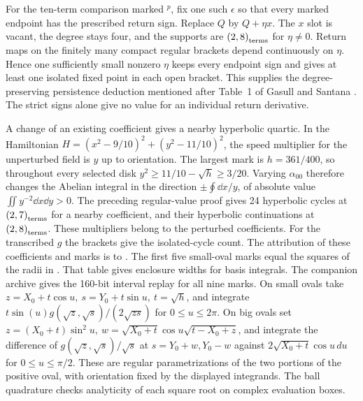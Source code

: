 For the ten-term comparison marked \(^{p}\), fix one such \(\epsilon\) so that every marked endpoint has the prescribed return sign. Replace \(Q\) by \(Q+\eta x\). The \(x\) slot is vacant, the degree stays four, and the supports are \(\left(2,8\right)_{\mathrm{terms}}\) for \(\eta\ne0\). Return maps on the finitely many compact regular brackets depend continuously on \(\eta\). Hence one sufficiently small nonzero \(\eta\) keeps every endpoint sign and gives at least one isolated fixed point in each open bracket. This supplies the degree-preserving persistence deduction mentioned after Table~1 of Gasull and Santana \cite{GasullSantana2024}. The strict signs alone give no value for an individual return derivative.

A change of an existing coefficient gives a nearby hyperbolic quartic. In the Hamiltonian \(H=(x^2-9/10)^2+(y^2-11/10)^2\), the speed multiplier for the unperturbed field is \(y\) up to orientation. The largest mark is \(h=361/400\), so throughout every selected disk \(y^2\ge11/10-\sqrt h\ge3/20\). Varying \(\alpha_{00}\) therefore changes the Abelian integral in the direction \(\pm\oint\dd x/y\), of absolute value \(\iint y^{-2}\dd x\dd y>0\). The preceding regular-value proof gives 24 hyperbolic cycles at \(\left(2,7\right)_{\mathrm{terms}}\) for a nearby coefficient, and their hyperbolic continuations at \(\left(2,8\right)_{\mathrm{terms}}\). These multipliers belong to the perturbed coefficients. For the transcribed \(g\) the brackets give the isolated-cycle count. The attribution of these coefficients and marks is to \cite[Theorem~7.1 and Table~2]{BBJT2024}. The first five small-oval marks equal the squares of the radii in \cite[\S6.2, Table~1]{BrehardMahboubiPous2019}. That table gives enclosure widths for basis integrals. The companion archive \cite{LuReplay} gives the 160-bit interval replay for all nine marks. On small ovals take \(z=X_0+t\cos u,\ s=Y_0+t\sin u,\ t=\sqrt h\), and integrate \(t\sin(u)g(\sqrt z,\sqrt s)/(2\sqrt{zs})\) for \(0\le u\le2\pi\). On big ovals set \(z=(X_0+t)\sin^2 u,\ w=\sqrt{X_0+t}\cos u\sqrt{t-X_0+z}\), and integrate the difference of \(g(\sqrt z,\sqrt s)/\sqrt s\) at \(s=Y_0+w,Y_0-w\) against \(2\sqrt{X_0+t}\cos u\,du\) for \(0\le u\le\pi/2\). These are regular parametrizations of the two portions of the positive oval, with orientation fixed by the displayed integrands. The ball quadrature checks analyticity of each square root on complex evaluation boxes.
